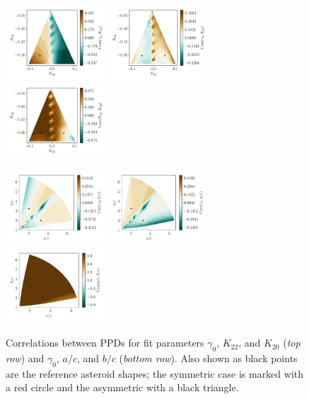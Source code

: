 \documentclass[fleqn,usenatbib]{mnras}
\begin{document}
\begin{figure}
  \includegraphics[width=0.33\textwidth]{figs/probe-space-corr12.pdf}\hfill
  \includegraphics[width=0.33\textwidth]{figs/probe-space-corr13.pdf}\hfill
  \includegraphics[width=0.33\textwidth]{figs/probe-space-corr23.pdf}

  \includegraphics[width=0.33\textwidth]{figs/probe-space-ab-1b.pdf}\hfill
  \includegraphics[width=0.33\textwidth]{figs/probe-space-ab-1a.pdf}\hfill
  \includegraphics[width=0.33\textwidth]{figs/probe-space-ab-ab.pdf}
  
  \caption{Correlations between PPDs for fit parameters $\gamma_0$, $K_{22}$, and $K_{20}$ (\textit{top row}) and $\gamma_0$, $a/c$, and $b/c$ (\textit{bottom row}).  Also shown as black points are the reference asteroid shapes; the symmetric case is marked with a red circle and the asymmetric with a black triangle.}
  \label{fig:scan-space-corr}
\end{figure}
\end{document}
